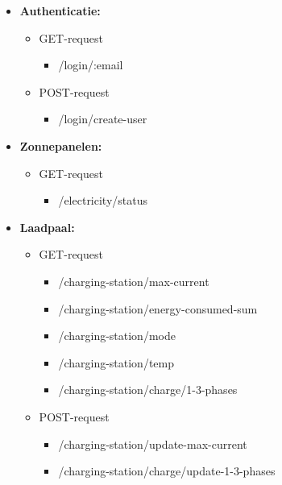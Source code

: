 \begin{itemize}
    \item \textbf{Authenticatie:}
          \begin{itemize}
                \item GET-request
                    \begin{itemize}
                        \item /login/:email
                    \end{itemize}
                \item POST-request
                    \begin{itemize}
                        \item /login/create-user
                    \end{itemize}
          \end{itemize}
    \item \textbf{Zonnepanelen:}
          \begin{itemize}
              \item GET-request
                    \begin{itemize}
                        \item /electricity/status
                    \end{itemize}
          \end{itemize}
    \item \textbf{Laadpaal:}
          \begin{itemize}
              \item GET-request
                    \begin{itemize}
                        \item /charging-station/max-current
                        \item /charging-station/energy-consumed-sum
                        \item /charging-station/mode
                        \item /charging-station/temp
                        \item /charging-station/charge/1-3-phases
                    \end{itemize}
              \item POST-request
                    \begin{itemize}
                        \item /charging-station/update-max-current
                        \item /charging-station/charge/update-1-3-phases

\end{itemize}
\end{itemize}
\end{itemize}
